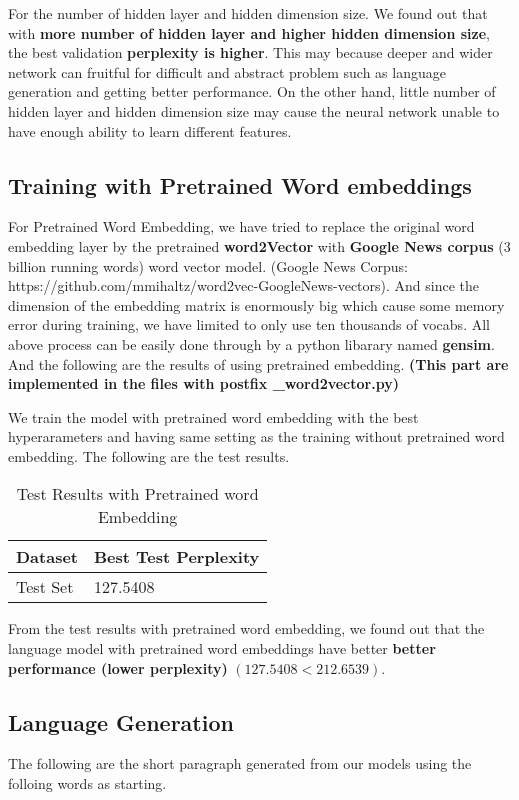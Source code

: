 \documentclass{article}
\begin{document}
For the number of hidden layer and hidden dimension size. We found out that with \textbf{more number of hidden layer and higher hidden dimension size}, the best validation \textbf{perplexity is higher}. This may because deeper and wider network can fruitful for difficult and abstract problem such as language generation and getting better performance. On the other hand, little number of hidden layer and hidden dimension size may cause the neural network unable to have enough ability to learn different features.

\subsection{Training with Pretrained Word embeddings}
For Pretrained Word Embedding, we have tried to replace the original word embedding layer by the pretrained \textbf{word2Vector} with \textbf{Google News corpus} (3 billion running words) word vector model. (Google News Corpus: https://github.com/mmihaltz/word2vec-GoogleNews-vectors). And since the dimension of the embedding matrix is enormously big which cause some memory error during training, we have limited to only use ten thousands of vocabs. All above process can be easily done through by a python libarary named \textbf{gensim}. And the following are the results of using pretrained embedding. \textbf{(This part are implemented in the files with postfix \_word2vector.py)}

We train the model with pretrained word embedding with the best hyperarameters and having same setting as the training without pretrained word embedding. The following are the test results.

\begin{table}[htb]
	\caption{Test Results with Pretrained word Embedding}
	\label{sample-table}
	\centering
	\begin{tabular}{ll}
		\toprule
		\cmidrule{1-2}
		Dataset & Best Test Perplexity\\
		\midrule
		Test Set & 127.5408   \\
		\bottomrule
	\end{tabular}
\end{table}

From the test results with pretrained word embedding, we found out that the language model with pretrained word embeddings have better \textbf{better performance (lower perplexity)} $(127.5408 < 212.6539)$. 

\subsection{Language Generation}
The following are the short paragraph generated from our models using the folloing words as starting.
\end{document}
